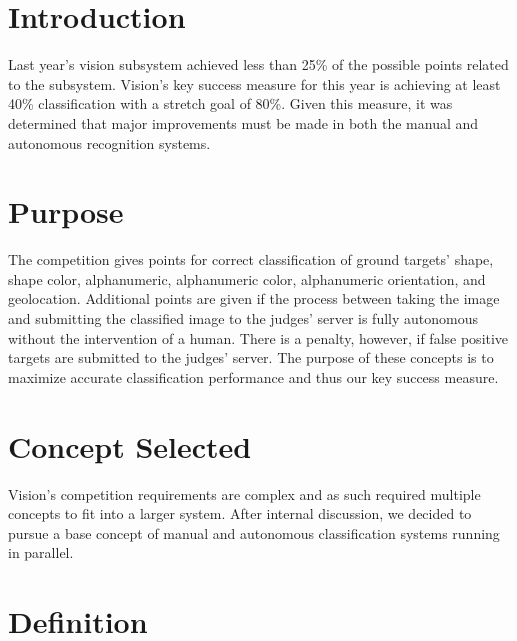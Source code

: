 \documentclass[]{auvsi_doc}
\begin{document}
\begin{AUVSITitlePage}
\begin{artifacttable}
\end{artifacttable}
\end{AUVSITitlePage}

\section{Introduction}

Last year's vision subsystem achieved less than 25\% of the possible points related to the subsystem.
Vision's key success measure for this year is achieving at least 40\% classification with a stretch
goal of 80\%. Given this measure, it was determined that major improvements must be made in both
the manual and autonomous recognition systems.

\section{Purpose}

The competition gives points for correct classification of ground targets' shape, shape color,
alphanumeric, alphanumeric color, alphanumeric orientation, and geolocation. Additional points
are given if the process between taking the image and submitting the classified image to the
judges' server is fully autonomous without the intervention of a human. There is a penalty,
however, if false positive targets are submitted to the judges' server. The purpose of these
concepts is to maximize accurate classification performance and thus our key success measure.

\section{Concept Selected}

Vision's competition requirements are complex and as such required multiple concepts to
fit into a larger system. After internal discussion, we decided to pursue a base concept
of manual and autonomous classification systems running in parallel.

\section{Definition}
\end{document}
